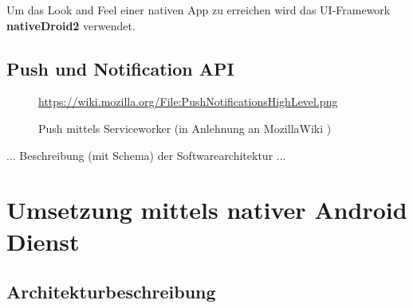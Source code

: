 Um das \glqq{}Look and Feel\grqq{} einer nativen App zu erreichen wird das UI-Framework \textbf{nativeDroid2} verwendet. \\


\subsection{Push und Notification API}
\label{subsubsec_konzeption_serviceworker_push-api}

\begin{figure}[htp] 
\caption{Push mittels Serviceworker (in Anlehnung an MozillaWiki \cite{MOZ_WIKI})}
\quelle\url{https://wiki.mozilla.org/File:PushNotificationsHighLevel.png}
\label{image_architektur-serviceworker-push}
\end{figure}  

... Beschreibung (mit Schema) der Softwarearchitektur ...

\newpage
\section{Umsetzung mittels nativer Android Dienst}
\label{subsec_konzeption_android}

\subsection{Architekturbeschreibung}
\label{subsubsec_konzeption_android_architektur}

